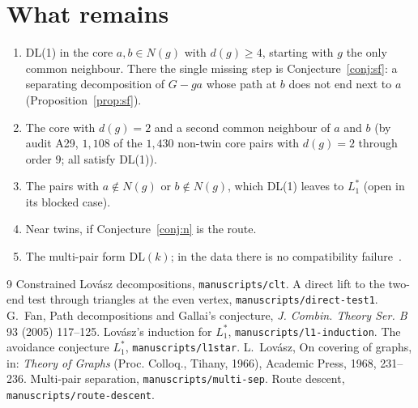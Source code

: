 \documentclass[11pt]{amsart}
\theoremstyle{definition}
\begin{document}
\section{What remains}\label{sec:open}
\begin{enumerate}
\item DL(1) in the core $a,b\in N(g)$ with $d(g)\ge4$, starting with $g$ the only common neighbour.
There the single missing step is Conjecture~\ref{conj:sf}: a separating decomposition of $G-ga$
whose path at $b$ does not end next to $a$ (Proposition~\ref{prop:sf}).
\item The core with $d(g)=2$ and a second common neighbour of $a$ and $b$ (by audit A29, $1{,}108$ of
the $1{,}430$ non-twin core pairs with $d(g)=2$ through order $9$; all satisfy DL(1)).
\item The pairs with $a\notin N(g)$ or $b\notin N(g)$, which DL(1) leaves to $L_1^*$ (open in its
blocked case).
\item Near twins, if Conjecture~\ref{conj:n} is the route.
\item The multi-pair form DL$(k)$; in the data there is no compatibility failure~\cite{DT}.
\end{enumerate}

\begin{thebibliography}{9}
 Constrained Lov\'asz decompositions, \texttt{manuscripts/clt}.
 A direct lift to the two-end test through triangles at the even vertex,
\texttt{manuscripts/direct-test1}.
 G.~Fan, Path decompositions and Gallai's conjecture, \emph{J. Combin. Theory Ser.
B} 93 (2005) 117--125.
 Lov\'asz's induction for $L_1^*$, \texttt{manuscripts/l1-induction}.
 The avoidance conjecture $L_1^*$, \texttt{manuscripts/l1star}.
 L.~Lov\'asz, On covering of graphs, in: \emph{Theory of Graphs} (Proc. Colloq.,
Tihany, 1966), Academic Press, 1968, 231--236.
 Multi-pair separation, \texttt{manuscripts/multi-sep}.
 Route descent, \texttt{manuscripts/route-descent}.
\end{thebibliography}
\end{document}
